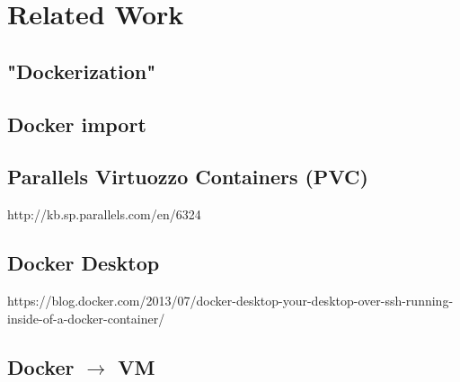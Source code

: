 \chapter{Related Work}


\section{"Dockerization"}


\section{Docker import}
\section{Parallels Virtuozzo Containers (PVC)}
http://kb.sp.parallels.com/en/6324

\section{Docker Desktop}
https://blog.docker.com/2013/07/docker-desktop-your-desktop-over-ssh-running-inside-of-a-docker-container/

\section{Docker $\to$ VM}